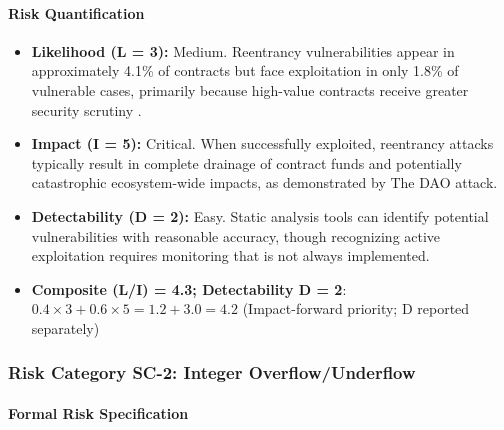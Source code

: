 \paragraph{Risk Quantification}

\begin{itemize}
\item \textbf{Likelihood (L = 3):} Medium. Reentrancy vulnerabilities appear in approximately 4.1\% of contracts but face exploitation in only 1.8\% of vulnerable cases, primarily because high-value contracts receive greater security scrutiny \cite{perez2021analysis}.

\item \textbf{Impact (I = 5):} Critical. When successfully exploited, reentrancy attacks typically result in complete drainage of contract funds and potentially catastrophic ecosystem-wide impacts, as demonstrated by The DAO attack.

\item \textbf{Detectability (D = 2):} Easy. Static analysis tools can identify potential vulnerabilities with reasonable accuracy, though recognizing active exploitation requires monitoring that is not always implemented.

\item \textbf{Composite (L/I) = 4.3; Detectability D = 2}: $0.4 \times 3 + 0.6 \times 5 = 1.2 + 3.0 = 4.2$ (Impact-forward priority; D reported separately)
\end{itemize}

\subsubsection{Risk Category SC-2: Integer Overflow/Underflow}

\paragraph{Formal Risk Specification}

